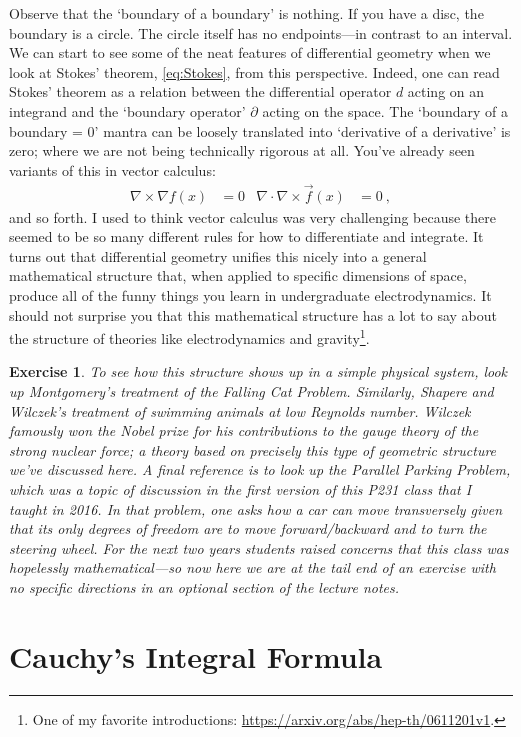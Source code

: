\documentclass[
  11pt,
	colorful,
	raggedright,
]{tufte-style-thesis-flip}
\newtheorem{exercise}{Exercise}[section]
\begin{document}
Observe that the `boundary of a boundary' is nothing. If you have a disc, the boundary is a circle. The circle itself has no endpoints---in contrast to an interval. We can start to see some of the neat features of differential geometry when we look at Stokes' theorem, \eqref{eq:Stokes}, from this perspective. Indeed, one can read Stokes' theorem as a relation between the differential operator $d$ acting on an integrand and the `boundary operator' $\partial$  acting on the space. The `boundary of a boundary = 0' mantra can be loosely translated into `derivative of a derivative' is zero; where we are not being technically rigorous at all. You've already seen variants of this in vector calculus:
\begin{align}
  \nabla\times \nabla f(x) &= 0
  &
  \nabla \cdot \nabla\times \vec{f}(x) &=0 \ ,
\end{align}
and so forth. I used to think vector calculus was very challenging because there seemed to be so many different rules for how to differentiate and integrate. It turns out that differential geometry unifies this nicely into a general mathematical structure that, when applied to specific dimensions of space, produce all of the funny things you learn in undergraduate electrodynamics. It should not surprise you that this mathematical structure has a lot to say about the structure of theories like electrodynamics and gravity\footnote{One of my favorite introductions: \url{https://arxiv.org/abs/hep-th/0611201v1}.}.
\begin{exercise}
To see how this structure shows up in a simple physical system, look up Montgomery's treatment of the Falling Cat Problem. Similarly, Shapere and Wilczek's treatment of swimming animals at low Reynolds number. Wilczek famously won the Nobel prize for his contributions to the gauge theory of the strong nuclear force; a theory based on precisely this type of geometric structure we've discussed here. A final reference is to look up the Parallel Parking Problem, which was a topic of discussion in the first version of this P231 class that I taught in 2016. In that problem, one asks how a car can move transversely given that its only degrees of freedom are to move forward/backward and to turn the steering wheel. For the next two years students raised concerns that this class was hopelessly mathematical---so now here we are at the tail end of an exercise with no specific directions in an optional section of the lecture notes.
\end{exercise}


\section{Cauchy's Integral Formula}
\end{document}
